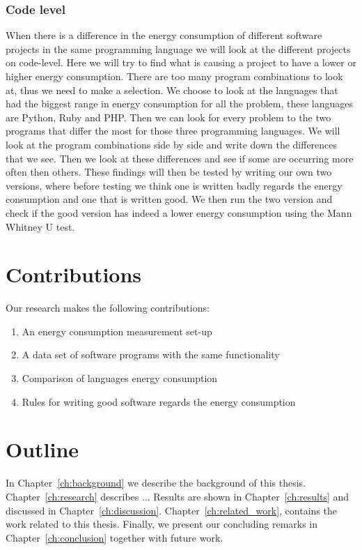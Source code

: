 \subsubsection{Code level}
When there is a difference in the energy consumption of different software projects in the same programming language we will look at the different projects on code-level. Here we will try to find what is causing a project to have a lower or higher energy consumption. There are too many program combinations to look at, thus we need to make a selection. We choose to look at the languages that had the biggest range in energy consumption for all the problem, these languages are Python, Ruby and PHP. Then we can look for every problem to the two programs that differ the most for those three programming languages. We will look at the program combinations side by side and write down the differences that we see. Then we look at these differences and see if some are occurring more often then others. These findings will then be tested by writing our own two versions, where before testing we think one is written badly regards the energy consumption and one that is written good. We then run the two version and check if the good version has indeed a lower energy consumption using the Mann Whitney U test.

\section{Contributions}
Our research makes the following contributions:
\begin{enumerate}
	\item An energy consumption measurement set-up
	\item A data set of software programs with the same functionality
	\item Comparison of languages energy consumption
	\item Rules for writing good software regards the energy consumption
\end{enumerate}

\section{Outline}
In Chapter~\ref{ch:background} we describe the background of this thesis. 
Chapter~\ref{ch:research} describes ... 
Results are shown in Chapter~\ref{ch:results} and discussed in Chapter~\ref{ch:discussion}. Chapter~\ref{ch:related_work}, contains the work related to this thesis.
Finally, we present our concluding remarks in Chapter~\ref{ch:conclusion} together with future work.

